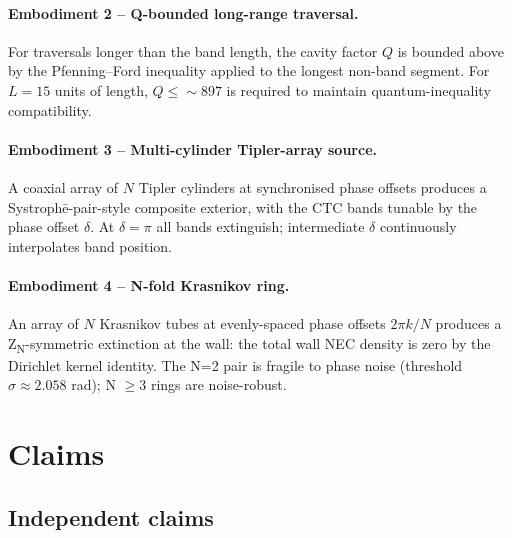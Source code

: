 \documentclass[11pt,a4paper]{article}
\begin{document}
\paragraph{Embodiment 2 -- Q-bounded long-range traversal.} For traversals longer than the band length, the cavity factor $Q$ is bounded above by the Pfenning--Ford inequality applied to the longest non-band segment. For $L = 15$ units of length, $Q \le \sim 897$ is required to maintain quantum-inequality compatibility.

\paragraph{Embodiment 3 -- Multi-cylinder Tipler-array source.} A coaxial array of $N$ Tipler cylinders at synchronised phase offsets produces a Systroph\=e-pair-style composite exterior, with the CTC bands tunable by the phase offset $\delta$. At $\delta = \pi$ all bands extinguish; intermediate $\delta$ continuously interpolates band position.

\paragraph{Embodiment 4 -- N-fold Krasnikov ring.} An array of $N$ Krasnikov tubes at evenly-spaced phase offsets $2\pi k / N$ produces a Z\textsubscript{N}-symmetric extinction at the wall: the total wall NEC density is zero by the Dirichlet kernel identity. The N=2 pair is fragile to phase noise (threshold $\sigma \approx 2.058$ rad); N $\ge 3$ rings are noise-robust.

\section{Claims}

\subsection{Independent claims}
\end{document}
